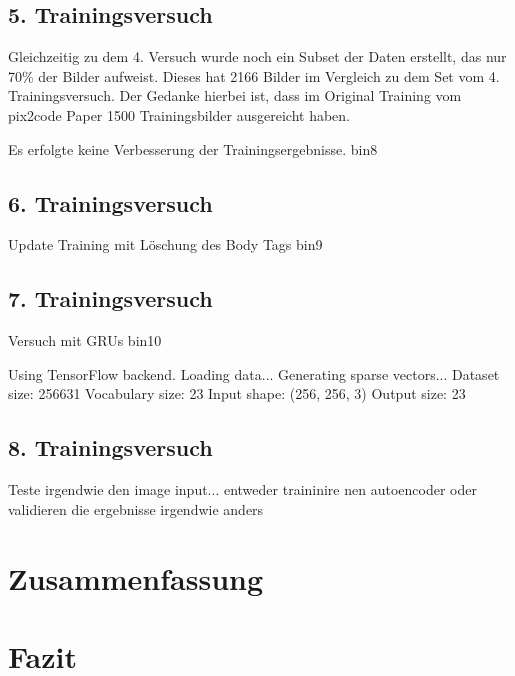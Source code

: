 \documentclass[pdftex,a4paper,halfparskip]{scrartcl}
\begin{document}
\subsection{5. Trainingsversuch}

Gleichzeitig zu dem 4. Versuch wurde noch ein Subset der Daten erstellt, das nur 70\% der Bilder aufweist. Dieses hat 2166 Bilder im Vergleich zu dem Set vom 4. Trainingsversuch. Der Gedanke hierbei ist, dass im Original Training vom pix2code Paper 1500 Trainingsbilder ausgereicht haben.

Es erfolgte keine Verbesserung der Trainingsergebnisse.
bin8


\subsection{6. Trainingsversuch}

Update Training mit Löschung des Body Tags
bin9

\subsection{7. Trainingsversuch}

Versuch mit GRUs \cite{GRUvsLSTM}
bin10

Using TensorFlow backend.
Loading data...
Generating sparse vectors...
Dataset size: 256631
Vocabulary size: 23
Input shape: (256, 256, 3)
Output size: 23
\subsection{8. Trainingsversuch}

Teste irgendwie den image input... entweder traininire nen autoencoder oder validieren die ergebnisse irgendwie anders




\section{Zusammenfassung}
\section{Fazit}


 
\end{document}
